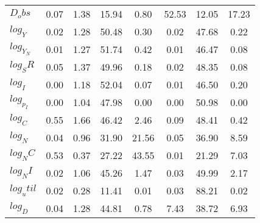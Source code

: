 \begin{center}
\begin{longtable}{lccccccc}
$D_obs     $	 & 	        0.07	 & 	        1.38	 & 	       15.94	 & 	        0.80	 & 	       52.53	 & 	       12.05	 & 	       17.23 \\ 
$log_Y     $	 & 	        0.02	 & 	        1.28	 & 	       50.48	 & 	        0.30	 & 	        0.02	 & 	       47.68	 & 	        0.22 \\ 
$log_Y_N   $	 & 	        0.01	 & 	        1.27	 & 	       51.74	 & 	        0.42	 & 	        0.01	 & 	       46.47	 & 	        0.08 \\ 
$log_SR    $	 & 	        0.05	 & 	        1.37	 & 	       49.96	 & 	        0.18	 & 	        0.02	 & 	       48.35	 & 	        0.08 \\ 
$log_I     $	 & 	        0.00	 & 	        1.18	 & 	       52.04	 & 	        0.07	 & 	        0.01	 & 	       46.50	 & 	        0.20 \\ 
$log_p_I   $	 & 	        0.00	 & 	        1.04	 & 	       47.98	 & 	        0.00	 & 	        0.00	 & 	       50.98	 & 	        0.00 \\ 
$log_C     $	 & 	        0.55	 & 	        1.66	 & 	       46.42	 & 	        2.46	 & 	        0.09	 & 	       48.41	 & 	        0.42 \\ 
$log_N     $	 & 	        0.04	 & 	        0.96	 & 	       31.90	 & 	       21.56	 & 	        0.05	 & 	       36.90	 & 	        8.59 \\ 
$log_NC    $	 & 	        0.53	 & 	        0.37	 & 	       27.22	 & 	       43.55	 & 	        0.01	 & 	       21.29	 & 	        7.03 \\ 
$log_NI    $	 & 	        0.02	 & 	        1.06	 & 	       45.26	 & 	        1.47	 & 	        0.03	 & 	       49.99	 & 	        2.17 \\ 
$log_util  $	 & 	        0.02	 & 	        0.28	 & 	       11.41	 & 	        0.01	 & 	        0.03	 & 	       88.21	 & 	        0.02 \\ 
$log_D     $	 & 	        0.04	 & 	        1.28	 & 	       44.81	 & 	        0.78	 & 	        7.43	 & 	       38.72	 & 	        6.93 \\ 
\end{longtable}
 \end{center}
